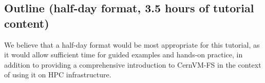 \subsection*{Outline (half-day format, 3.5 hours of tutorial content)}

We believe that a half-day format would be most appropriate for this tutorial, as it would allow sufficient
time for guided examples and hands-on practice, in addition to providing a comprehensive introduction to CernVM-FS
in the context of using it on HPC infrastructure.

% 

